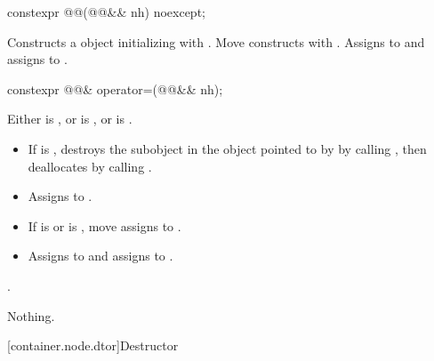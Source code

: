 \begin{itemdecl}
constexpr @@(@@&& nh) noexcept;
\end{itemdecl}

\begin{itemdescr}
\pnum
\effects
Constructs a  object initializing
 with .  Move constructs  with
.  Assigns  to  and assigns
 to .
\end{itemdescr}

\begin{itemdecl}
constexpr @@& operator=(@@&& nh);
\end{itemdecl}

\begin{itemdescr}
\pnum
\expects
Either  is , or
is , or  is .

\pnum
\effects
\begin{itemize}
\item
If  is , destroys the 
subobject in the  object pointed to by 
by calling , then deallocates  by
calling .
\item
Assigns  to .
\item
If  is  or
is , \linebreak
move assigns  to .
\item
Assigns
 to  and assigns  to
.
\end{itemize}

\pnum
\returns
{}.

\pnum
\throws
Nothing.
\end{itemdescr}

[container.node.dtor]{Destructor}

